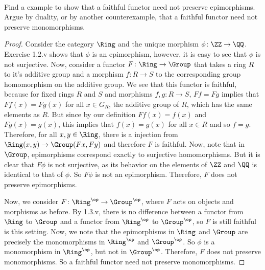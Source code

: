 \documentclass[main.tex]{subfiles}
\begin{document}
\paragraph{}
\begin{exercise}
	Find a example to show that a faithful functor need not preserve
	epimorphisms. Argue by duality, or by another counterexample, that a
	faithful functor need not preserve monomorphisms.
\end{exercise}
\begin{proof}
	Consider the category $\Ring$ and the unique morphism $\phi\colon \ZZ \rightarrow
	\QQ$. Exercise 1.2.v shows that $\phi$ is an epimorphism, however, it is
	easy to see that $\phi$ is not surjective. Now, consider a functor $F\colon \Ring
	\rightarrow \Group$ that takes a ring $R$ to it's additive group and a
	morphism $f\colon R \rightarrow S$ to the corresponding group homomorphism on the
	additive group. We see that this functor is faithful, because for fixed
	rings $R$ and $S$ and morphisms $f,g \colon R \rightarrow S$, $Ff = Fg$ implies
	that $Ff(x) = Fg(x)$ for all $x \in G_R$, the additive group of $R$, which
	has the same elements as $R$. But since by our definition $Ff(x) = f(x)$ and
	$Fg(x) = g(x)$, this implies that $f(x) = g(x)$ for all $x \in R$ and so $f =
	g$. Therefore, for all $x,y \in \Ring$, there is a injection from
	$\Ring(x,y) \rightarrow \Group (Fx,Fy)$ and therefore $F$ is faithful.  Now,
	note that in $\Group$, epimorphisms correspond exactly to surjective
	homomorphisms. But it is clear that $F\phi$ is not surjective, as its
	behavior on the elements of $\ZZ$ and $\QQ$ is identical to that of $\phi$.
	So $F\phi$ is not an epimorphism. Therefore, $F$ does not preserve
	epimorphisms.

	Now, we consider $F\colon \Ring^{\op} \rightarrow \Group^{\op}$, where $F$ acts on
	objects and morphisms as before. By 1.3.v, there is no difference between a
	functor from $\Ring$ to $\Group$ and a functor from $\Ring^{\op}$ to
	$\Group^{\op}$, so $F$ is still faithful is this setting. Now, we note that
	the epimorphisms in $\Ring$ and $\Group$ are precisely the monomorphisms in
	$\Ring^{\op}$ and $\Group^{\op}$. So $\phi$ is a monomorphism in $\Ring^{\op}$,
	but not in $\Group^{\op}$. Therefore, $F$ does not preserve monomorphisms. So
	a faithful functor need not preserve monomorphisms.
\end{proof}
\end{document}
